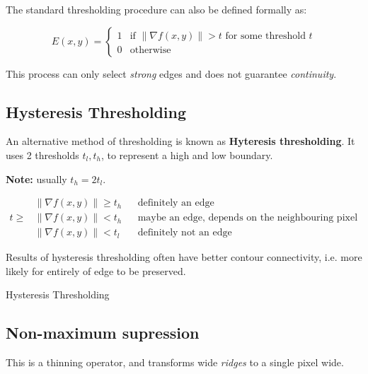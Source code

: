 \documentclass{article}
\begin{document}
The standard thresholding procedure can also be defined formally as:

\[
  E(x,y) = \begin{cases}
    1 & \text{if } \| \nabla f(x,y) \| > t \text{ for some threshold } t\\
    0 & \text{otherwise}
  \end{cases}
\]

This process can only select \textit{strong} edges and does not guarantee \textit{continuity}.

\subsection{Hysteresis Thresholding}

An alternative method of thresholding is known as \textbf{Hyteresis thresholding}. It uses 2 thresholds $t_{l},t_{h}$, to represent a high and low boundary.

\textbf{Note:} usually $t_{h} = 2t_{l}$.

\begin{align*}
  & \|\nabla f(x,y) \| \geq t_{h} && \text{definitely an edge} \\
  t \geq & \| \nabla f(x,y) \| < t_{h} && \text{maybe an edge, depends on the neighbouring pixel classifications} \\
  & \| \nabla f(x,y) \| < t_{l} && \text{definitely not an edge}
\end{align*}

Results of hysteresis thresholding often have better contour connectivity, i.e. more likely for entirely of edge to be preserved.

\begin{algorithm}
  \caption{Hysteresis Thresholding}
\end{algorithm}

\subsection{Non-maximum supression}



This is a thinning operator, and transforms wide \textit{ridges} to a single pixel wide.
\end{document}
